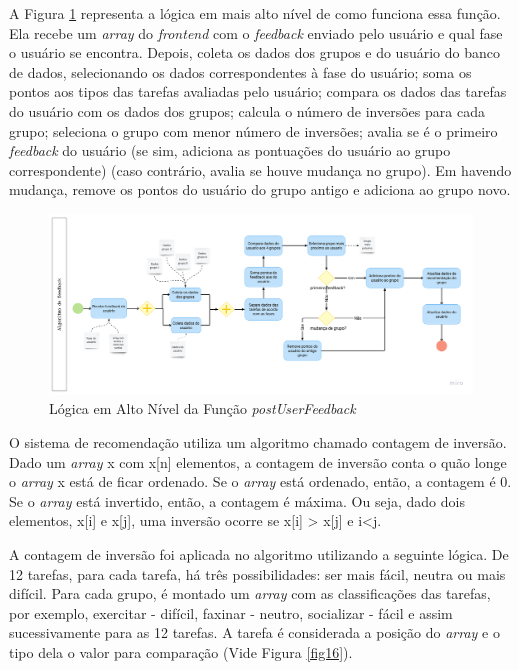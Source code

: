 A Figura \ref{fig15} representa a lógica em mais alto nível de como funciona essa função. Ela recebe 
um \emph{array} do \emph{frontend} com o \emph{feedback} enviado pelo usuário e qual fase o usuário se encontra. 
Depois, coleta os dados dos grupos e do usuário do banco de dados, selecionando os dados correspondentes à fase 
do usuário; soma os pontos aos tipos das tarefas avaliadas pelo usuário; compara os dados das tarefas do usuário 
com os dados dos grupos; calcula o número de inversões para cada grupo; seleciona o grupo com menor 
número de inversões; avalia se é o primeiro \emph{feedback} do usuário (se sim, adiciona as pontuações do usuário ao grupo correspondente) 
(caso contrário, avalia se houve mudança no grupo). Em havendo mudança, remove os pontos do usuário do grupo antigo e adiciona ao grupo novo. 

\begin{figure}[htbp]
	\caption{Lógica em Alto Nível da Função \emph{postUserFeedback }}
	\begin{center}
	\includegraphics[keepaspectratio=true,scale=0.14]{figuras/recomendacao.png}
	\end{center}
    \label{fig15}
\end{figure}

O sistema de recomendação utiliza um algoritmo chamado contagem de inversão. 
Dado um \emph{array} x com x[n] elementos, a contagem de inversão conta o quão longe o \emph{array} x está de ficar 
ordenado. Se o \emph{array} está ordenado, então, a contagem é 0. Se o \emph{array} está invertido, 
então, a contagem é máxima. Ou seja, dado dois elementos, x[i] e x[j], uma 
inversão ocorre se x[i] > x[j] e i<j.

A contagem de inversão foi aplicada no algoritmo utilizando a seguinte lógica. 
De 12 tarefas, para cada tarefa, 
há três possibilidades: ser mais fácil, neutra ou mais difícil. Para cada grupo, é montado um \emph{array} 
com as classificações das tarefas, por exemplo, exercitar - difícil, faxinar - neutro, socializar - fácil e assim 
sucessivamente para as 12 tarefas. A tarefa é considerada a posição do \emph{array} 
e o tipo dela o valor para comparação (Vide Figura \ref{fig16}).

